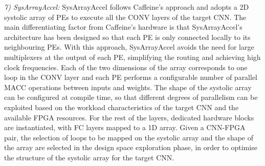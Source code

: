 \documentclass[format=acmsmall, review=false, screen=true]{acmart}
\begin{document}
\textit{7) SysArrayAccel:}
SysArrayAccel follows Caffeine's approach and adopts a 2D systolic array of PEs to execute all the CONV layers of the target CNN. The main differentiating factor from Caffeine's hardware is that \mbox{SysArrayAccel}'s architecture has been designed so that each PE is only connected locally to its neighbouring PEs. With this approach, SysArrayAccel avoids the need for large multiplexers at the output of each PE, simplifying the routing and achieving high clock frequencies. Each of the two dimensions of the array corresponds to one loop in the CONV layer and each PE performs a configurable number of parallel MACC operations between inputs and weights. The shape of the systolic array can be configured at compile time, so that different degrees of parallelism can be exploited based on the workload characteristics of the target CNN and the available FPGA resources. For the rest of the layers, dedicated hardware blocks are instantiated, with FC layers mapped to a 1D array. Given a CNN-FPGA pair, the selection of loops to be mapped on the systolic array and the shape of the array are selected in the design space exploration phase, in order to optimise the structure of the systolic array for the target CNN.
\end{document}
